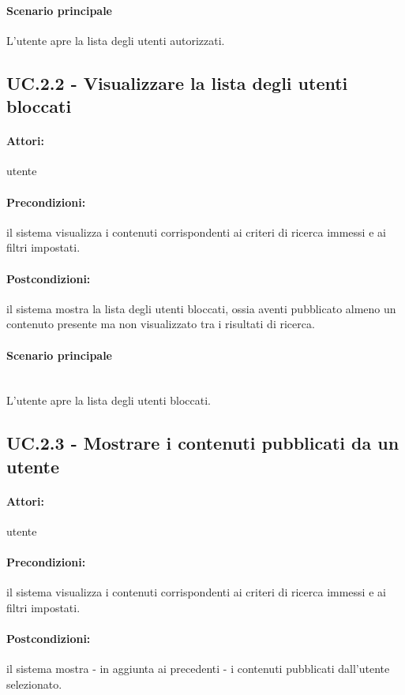 \documentclass[10pt,a4paper,headinclude,footinclude,hidelinks]{scrreprt} %
\begin{document}
	\paragraph{Scenario principale}
	L'utente apre la lista degli utenti autorizzati.

	\subsection[UC.2.2]{UC.2.2 - Visualizzare la lista degli utenti bloccati}
	\label{ch:stage:ar:uc:2_2}
	\paragraph{Attori:} utente
	\paragraph{Precondizioni:} il sistema visualizza i contenuti corrispondenti ai criteri di ricerca immessi e ai filtri impostati.
	\paragraph{Postcondizioni:} il sistema mostra la lista degli utenti bloccati, ossia aventi pubblicato almeno un contenuto presente ma non visualizzato tra i risultati di ricerca.
	\paragraph{Scenario principale} \hfill \\
	L'utente apre la lista degli utenti bloccati.

	\subsection[UC.2.3]{UC.2.3 - Mostrare i contenuti pubblicati da un utente}
	\label{ch:stage:ar:uc:2_3}
	\paragraph{Attori:} utente
	\paragraph{Precondizioni:} il sistema visualizza i contenuti corrispondenti ai criteri di ricerca immessi e ai filtri impostati.
	\paragraph{Postcondizioni:} il sistema mostra - in aggiunta ai precedenti - i contenuti pubblicati dall'utente selezionato.
\end{document}

